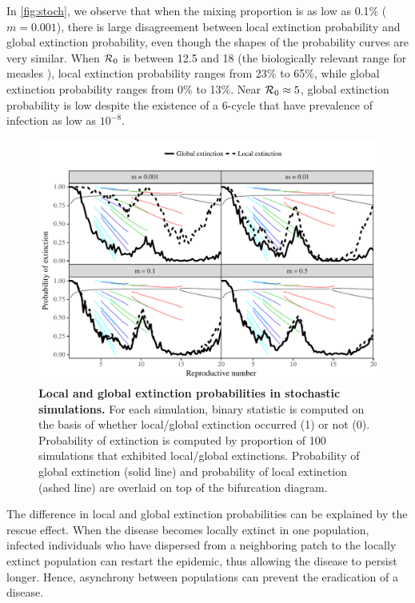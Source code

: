 \documentclass[12pt]{article}
\newcommand{\R}{{\cal R}}
\begin{document}
In \autoref{fig:stoch}, we observe that when the mixing proportion is as low as 0.1\% ($m = 0.001$), there is large disagreement between local extinction probability and global extinction probability, even though the shapes of the probability curves are very similar. 
When $\R_0$ is between 12.5 and 18 (the biologically relevant range for measles \cite{anderson1982directly}), local extinction probability ranges from 23\% to 65\%, while global extinction probability ranges from 0\% to 13\%. 
Near $\R_0 \approx 5$, global extinction probability is low despite the existence of a 6-cycle that have prevalence of infection as low as $10^{-8}$.

\begin{figure}[h]
    \centering
    \includegraphics[width=\textwidth]{supplementary/stochastic.pdf}
    \caption{
    \textbf{Local and global extinction probabilities in stochastic simulations.}
    For each simulation, binary statistic is computed on the basis of whether local/global extinction occurred (1) or not (0). Probability of extinction is computed by proportion of 100 simulations that exhibited local/global extinctions.
    Probability of global extinction (solid line) and probability of local extinction (ashed line) are overlaid on top of the bifurcation diagram.
    }
    \label{fig:stoch}
\end{figure}

The difference in local and global extinction probabilities can be explained by the rescue effect. 
When the disease becomes locally extinct in one population, infected individuals who have dispersed from a neighboring patch to the locally extinct population can restart the epidemic, thus allowing the disease to persist longer. 
Hence, asynchrony between populations can prevent the eradication of a disease.
\end{document}
